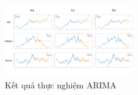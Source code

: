 \begin{figure}[htbp]
\centerline{\includegraphics[width=0.5\textwidth]{img/Arima_result.png}}
\caption{Kết quả thực nghiệm ARIMA}
\label{fig}
\end{figure}